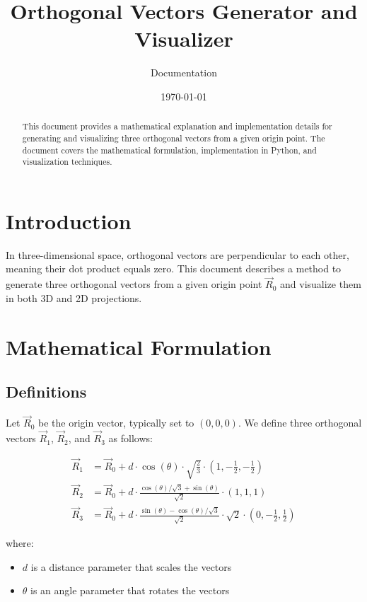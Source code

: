 \documentclass{article}
\title{Orthogonal Vectors Generator and Visualizer}
\author{Documentation}
\date{\today}
\begin{document}
\maketitle

\begin{abstract}
This document provides a mathematical explanation and implementation details for generating and visualizing three orthogonal vectors from a given origin point. The document covers the mathematical formulation, implementation in Python, and visualization techniques.
\end{abstract}

\tableofcontents

\section{Introduction}
In three-dimensional space, orthogonal vectors are perpendicular to each other, meaning their dot product equals zero. This document describes a method to generate three orthogonal vectors from a given origin point $\vec{R}_0$ and visualize them in both 3D and 2D projections.

\section{Mathematical Formulation}

\subsection{Definitions}
Let $\vec{R}_0$ be the origin vector, typically set to $(0, 0, 0)$. We define three orthogonal vectors $\vec{R}_1$, $\vec{R}_2$, and $\vec{R}_3$ as follows:

\begin{align}
\vec{R}_1 &= \vec{R}_0 + d \cdot \cos(\theta) \cdot \sqrt{\frac{2}{3}} \cdot (1, -\frac{1}{2}, -\frac{1}{2}) \\
\vec{R}_2 &= \vec{R}_0 + d \cdot \frac{\cos(\theta)/\sqrt{3} + \sin(\theta)}{\sqrt{2}} \cdot (1, 1, 1) \\
\vec{R}_3 &= \vec{R}_0 + d \cdot \frac{\sin(\theta) - \cos(\theta)/\sqrt{3}}{\sqrt{2}} \cdot \sqrt{2} \cdot (0, -\frac{1}{2}, \frac{1}{2})
\end{align}

where:
\begin{itemize}
    \item $d$ is a distance parameter that scales the vectors
    \item $\theta$ is an angle parameter that rotates the vectors
\end{itemize}
\end{document}
